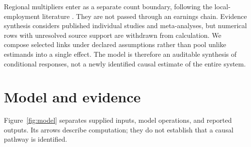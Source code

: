 \documentclass[10pt]{article}
\begin{document}
Regional multipliers enter as a separate count boundary, following the
local-employment literature \cite{moretti2010}. They are not passed through
an earnings chain. Evidence synthesis considers published individual
studies and meta-analyses, but numerical rows with unresolved source support
are withdrawn from calculation. We compose selected
links under declared assumptions rather than pool unlike estimands into a
single effect. The model is therefore an auditable synthesis of conditional
responses, not a newly identified causal estimate of the entire system.

\section{Model and evidence}
Figure~\ref{fig:model} separates supplied inputs, model operations, and
reported outputs. Its arrows describe computation; they do not establish
that a causal pathway is identified.


\end{document}
